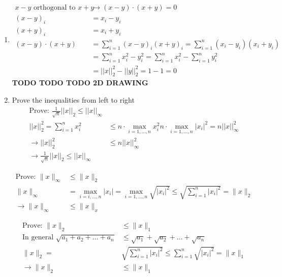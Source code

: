 \documentclass[11pt]{article}
\begin{document}
\begin{solution}
\begin{enumerate}
\item
\begin{align*}
    x - y \text{ orthogonal to } x + y &\rightarrow (x-y) \cdot (x+y) = 0 \\
    (x-y)_i &= x_i - y_i \\
    (x+y)_i &= x_i + y_i \\
    (x-y) \cdot (x+y) &= \sum_{i=1}^n (x-y)_i (x+y)_i = \sum_{i=1}^n (x_i-y_i)(x_i+y_i) \\
    &= \sum_{i=1}^n x_i^2 - y_i^2 = \sum_{i=1}^n x_i^2 - \sum_{i=1}^n y_i^2 \\
    &= ||x||_2^2 - ||y||_2^2 = 1 - 1 = 0
\end{align*}
        \textbf{TODO TODO TODO 2D DRAWING}

\item Prove the inequalities from left to right
\begin{align*}
    \text{Prove: } \frac{1}{\sqrt{n}} ||x||_2 \leq ||x||_{\infty} \\
    ||x||_2^2 = \sum_{i=1}^n x_i^2 &\leq n \cdot \max_{i=1,\dots,n} x_i^2 n \cdot \max_{i=1,\dots,n} |x_i|^2 = n ||x||_{\infty}^2 \\
    \rightarrow ||x||_2^2 &\leq n ||x||_{\infty}^2 \\
    \rightarrow \frac{1}{\sqrt{n}} ||x||_2 \leq ||x||_{\infty}
\end{align*}

\begin{align*}
    \text{Prove: } \|x\|_{\infty} &\leq \|x\|_2 \\
    \|x\|_{\infty} &= \max_{i=i,\dots,n} |x_i| = \max_{i=1,\dots,n} \sqrt{|x_i|^2} \leq \sqrt{\sum_{i=1}^n |x_i|^2} = \|x\|_2 \\
    \rightarrow \|x\|_{\infty} &\leq \|x\|_x
\end{align*}

\begin{align*}
    \text{Prove: } \|x\|_2 &\leq \|x\|_1 \\
    \text{In general } \sqrt{a_1 + a_2 + \dots + a_n} &\leq \sqrt{a_1} + \sqrt{a_2} + \dots + \sqrt{a_n} \\
    \|x\|_2 = &\sqrt{\sum_{i=1}^n |x_i|^2} \leq \sum_{i=1}^n \sqrt{|x_i|^2} = \|x\|_1 \\
    \rightarrow \|x\|_2 &\leq \|x\|_1
\end{align*}


\end{enumerate}
\end{solution}
\end{document}
